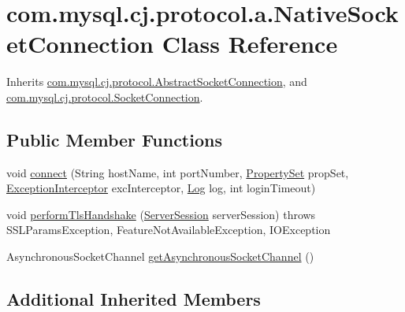 \hypertarget{classcom_1_1mysql_1_1cj_1_1protocol_1_1a_1_1_native_socket_connection}{}\section{com.\+mysql.\+cj.\+protocol.\+a.\+Native\+Socket\+Connection Class Reference}
\label{classcom_1_1mysql_1_1cj_1_1protocol_1_1a_1_1_native_socket_connection}


Inherits \mbox{\hyperlink{classcom_1_1mysql_1_1cj_1_1protocol_1_1_abstract_socket_connection}{com.\+mysql.\+cj.\+protocol.\+Abstract\+Socket\+Connection}}, and \mbox{\hyperlink{interfacecom_1_1mysql_1_1cj_1_1protocol_1_1_socket_connection}{com.\+mysql.\+cj.\+protocol.\+Socket\+Connection}}.

\subsection*{Public Member Functions}
\begin{DoxyCompactItemize}
\item 
void \mbox{\hyperlink{classcom_1_1mysql_1_1cj_1_1protocol_1_1a_1_1_native_socket_connection_a01b21bd9bd524d07d1467c758900a102}{connect}} (String host\+Name, int port\+Number, \mbox{\hyperlink{interfacecom_1_1mysql_1_1cj_1_1conf_1_1_property_set}{Property\+Set}} prop\+Set, \mbox{\hyperlink{interfacecom_1_1mysql_1_1cj_1_1exceptions_1_1_exception_interceptor}{Exception\+Interceptor}} exc\+Interceptor, \mbox{\hyperlink{interfacecom_1_1mysql_1_1cj_1_1log_1_1_log}{Log}} log, int login\+Timeout)
\item 
void \mbox{\hyperlink{classcom_1_1mysql_1_1cj_1_1protocol_1_1a_1_1_native_socket_connection_a00e90b14ed518b12733a936a3b707134}{perform\+Tls\+Handshake}} (\mbox{\hyperlink{interfacecom_1_1mysql_1_1cj_1_1protocol_1_1_server_session}{Server\+Session}} server\+Session)  throws S\+S\+L\+Params\+Exception, Feature\+Not\+Available\+Exception, I\+O\+Exception 
\item 
Asynchronous\+Socket\+Channel \mbox{\hyperlink{classcom_1_1mysql_1_1cj_1_1protocol_1_1a_1_1_native_socket_connection_a2c48d7701f27174e67e79cee1deb78d1}{get\+Asynchronous\+Socket\+Channel}} ()
\end{DoxyCompactItemize}
\subsection*{Additional Inherited Members}


